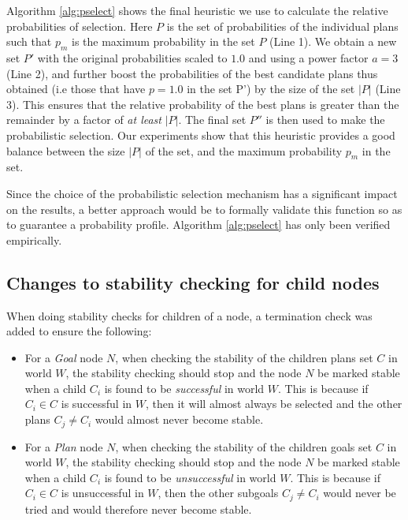 \documentclass[a4paper]{article}
\begin{document}
Algorithm \ref{alg:pselect} shows the final heuristic we use to calculate the relative probabilities of selection. Here $P$ is the set of probabilities of the individual plans such that $p_m$ is the maximum probability in the set $P$ (Line 1). We obtain a new set $P'$ with the original probabilities scaled to $1.0$ and using a power factor $a=3$ (Line 2), and further boost the probabilities of the best candidate plans thus obtained (i.e those that have  $p=1.0$ in the set P') by the size of the set $|P|$ (Line 3). This ensures that the relative probability of the best plans is greater than the remainder by a factor of \textit{at least} $|P|$. The final set $P''$ is then used to make the probabilistic selection. Our experiments show that this heuristic provides a good balance between the size $|P|$ of the set, and the maximum probability $p_m$ in the set.

Since the choice of the probabilistic selection mechanism has a significant impact on the results, a better approach would be to formally validate this function so as to guarantee a probability profile. Algorithm \ref{alg:pselect} has only been verified empirically.

\subsection{Changes to stability checking for child nodes}

When doing stability checks for children of a node, a termination check was added to ensure the following:

\begin{itemize}
\item For a \textit{Goal} node $N$, when checking the stability of the children plans set $C$ in world $W$, the stability checking should stop and the node $N$ be marked stable when a child $C_i$ is found to be \textit{successful} in world $W$. This is because if $C_i \in C$ is successful in $W$, then it will almost always be selected and the other plans $C_j \neq C_i$ would almost never become stable.
\item For a \textit{Plan} node $N$, when checking the stability of the children goals set $C$ in world $W$, the stability checking should stop and the node $N$ be marked stable when a child $C_i$ is found to be \textit{unsuccessful} in world $W$. This is because if $C_i \in C$ is unsuccessful in $W$, then the other subgoals $C_j \neq C_i$ would never be tried and would therefore never become stable.

\end{itemize}
\end{document}
